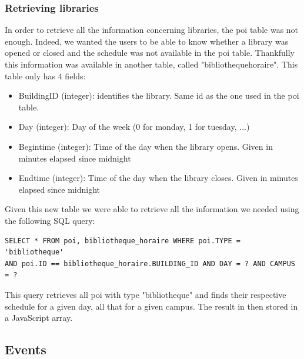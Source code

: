 \documentclass[11pt, a4paper]{report}
\begin{document}
\subsubsection{Retrieving libraries}

In order to retrieve all the information concerning libraries, the poi table was not enough. Indeed, we wanted the users to be able to know whether a library was opened or closed and the schedule was not available in the poi table. Thankfully this information was available in another table, called "bibliotheque\textunderscore horaire". This table only has 4 fields:

\begin{itemize}
\item Building\textunderscore ID (integer): identifies the library. Same id as the one used in the poi table.
\item Day (integer): Day of the week (0 for monday, 1 for tuesday, ...)
\item Begin\textunderscore time (integer): Time of the day when the library opens. Given in minutes elapsed since midnight
\item End\textunderscore time (integer): Time of the day when the library closes. Given in minutes elapsed since midnight
\end{itemize}

Given this new table we were able to retrieve all the information we needed using the following SQL query:
\begin{verbatim}
SELECT * FROM poi, bibliotheque_horaire WHERE poi.TYPE = 'bibliotheque' 
AND poi.ID == bibliotheque_horaire.BUILDING_ID AND DAY = ? AND CAMPUS = ?
\end{verbatim}

This query retrieves all poi with type "bibliotheque" and finds their respective schedule for a given day, all that for a given campus. The result in then stored in a JavaScript array.

\subsection{Events}
\end{document}
